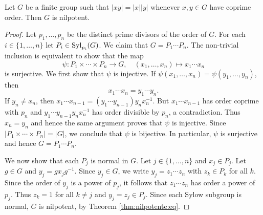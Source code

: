 \begin{theorem}
	Let $G$ be a finite group such that $|xy|=|x||y|$ whenever $x,y\in G$ have coprime order. Then
	$G$ is nilpotent. 
\end{theorem}

\begin{proof}
	Let $p_1,\dots,p_n$ be the distinct prime divisors of the order of $G$. For each 
	$i\in\{1,\dots,n\}$ let $P_i\in\mathrm{Syl}_{p_i}(G)$. We claim that 
	$G=P_1\cdots P_n$. The non-trivial inclusion is equivalent to show that the map
	\[
		\psi\colon P_1\times\cdots\times P_n\to G,\quad
		(x_1,\dots,x_n)\mapsto x_1\cdots x_n
	\]
	is surjective. We first show that $\psi$ is injective. If 
	$\psi(x_1,\dots,x_n)=\psi(y_1,\dots,y_n)$, then  
	\[
		x_1\cdots
	x_n=y_1\cdots y_n. 
	\]
	If $y_n\ne x_n$, then $x_1\cdots x_{n-1}=(y_1\cdots
	y_{n-1})y_nx_n^{-1}$. But $x_1\cdots x_{n-1}$ has order coprime with 
	$p_n$ and $y_1\cdots y_{n-1}y_nx_n^{-1}$ has order divisible by $p_n$, a contradiction. 
	Thus $x_n=y_n$ and hence the same argument proves that $\psi$ is injective. 
	Since $|P_1\times\cdots\times
	P_n|=|G|$, we conclude that $\psi$ is bijective. In particular, $\psi$ is surjective and hence 
	$G=P_1\cdots P_n$.

	We now show that each $P_j$ is normal in $G$.  Let $j\in\{1,\dots,n\}$ and 
	$x_j\in P_j$. Let $g\in G$ and $y_j=gx_jg^{-1}$.  Since $y_j\in G$,
	we write $y_j=z_1\cdots z_n$ with $z_k\in P_k$ for all $k$. Since the order of 
	$y_j$ is a power of $p_j$, it follows that $z_1\cdots
	z_n$ has order a power of $p_j$. Thus $z_k=1$ for all $k\ne j$ and 
	$y_j=z_j\in P_j$. Since each Sylow subgroup is normal, $G$ is nilpotent, by Theorem \ref{thm:nilpotente:eq}. 
\end{proof}







%
%


